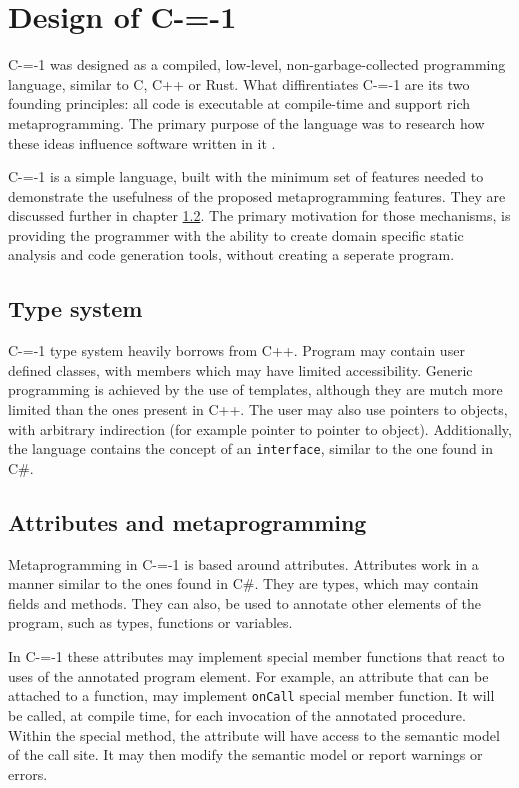 \section{Design of C-=-1}
\label{language-design}

C-=-1 was designed as a compiled, low-level, non-garbage-collected programming language, similar to C, C++ or Rust.
What diffirentiates C-=-1 are its two founding principles: all code is executable at compile-time and support rich metaprogramming.
The primary purpose of the language was to research how these ideas influence software written in it \cite{grabski2022compilation}.

C-=-1 is a simple language, built with the minimum set of features needed to demonstrate the usefulness of the proposed metaprogramming features.
They are discussed further in chapter \ref{design:attributes_and_metaprogramming}.
The primary motivation for those mechanisms, is providing the programmer with the ability to create domain specific static analysis and code generation tools, without creating a seperate program.

\subsection{Type system}

C-=-1 type system heavily borrows from C++.
Program may contain user defined classes, with members which may have limited accessibility.
Generic programming is achieved by the use of templates, although they are mutch more limited than the ones present in C++.
The user may also use pointers to objects, with arbitrary indirection (for example pointer to pointer to object).
Additionally, the language contains the concept of an \lstinline{interface}, similar to the one found in C\#.

\subsection{Attributes and metaprogramming}
\label{design:attributes_and_metaprogramming}

Metaprogramming in C-=-1 is based around attributes.
Attributes work in a manner similar to the ones found in C\#.
They are types, which may contain fields and methods.
They can also, be used to annotate other elements of the program, such as types, functions or variables.

In C-=-1 these attributes may implement special member functions that react to uses of the annotated program element.
For example, an attribute that can be attached to a function, may implement \lstinline{onCall} special member function.
It will be called, at compile time, for each invocation of the annotated procedure.
Within the special method, the attribute will have access to the semantic model of the call site.
It may then modify the semantic model or report warnings or errors.

